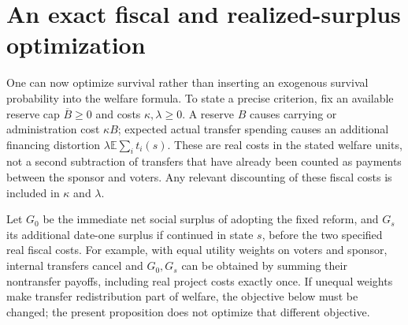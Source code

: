 \documentclass[11pt]{article}
\theoremstyle{definition}
\begin{document}
\section*{An exact fiscal and realized-surplus optimization}
One can now optimize survival rather than inserting an exogenous
survival probability into the welfare formula. To state a precise
criterion, fix an available reserve cap $\overline B\geq0$ and costs
$\kappa,\lambda\geq0$. A reserve $B$ causes carrying or administration
cost $\kappa B$; expected actual transfer spending causes an additional
financing distortion $\lambda\mathbb E\sum_i t_i(s)$. These are real
costs in the stated welfare units, not a second subtraction of transfers
that have already been counted as payments between the sponsor and
voters. Any relevant discounting of these fiscal costs is included in
$\kappa$ and $\lambda$.

Let $G_0$ be the immediate net social surplus of adopting the fixed
reform, and $G_s$ its additional date-one surplus if continued in
state $s$, before the two specified real fiscal costs. For example,
with equal utility weights on voters and sponsor, internal transfers
cancel and $G_0,G_s$ can be obtained by summing their nontransfer
payoffs, including real project costs exactly once. If unequal weights
make transfer redistribution part of welfare, the objective below must
be changed; the present proposition does not optimize that different
objective.
\end{document}
